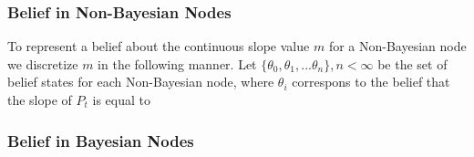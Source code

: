 \documentclass[a4paper,12pt]{article}
\begin{document}
\subsubsection{Belief in Non-Bayesian Nodes}

To represent a belief about the continuous slope value $m$ for a Non-Bayesian node we discretize $m$ in the following manner.  Let $\{\theta_0, \theta_1,...\theta_n\}, n < \infty$ be the set of belief states for each Non-Bayesian node, where $\theta_i$ correspons to the belief that the slope of $P_t$ is equal to 

\subsubsection{Belief in Bayesian Nodes}
\end{document}
